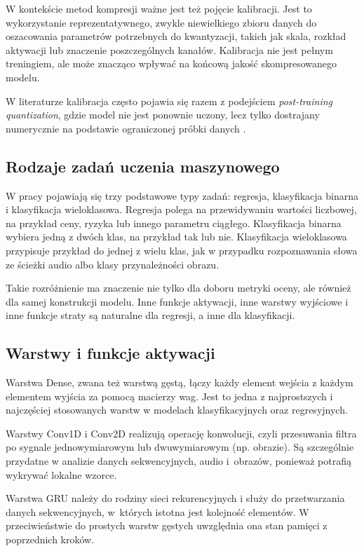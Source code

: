 W kontekście metod kompresji ważne jest też pojęcie kalibracji. Jest to wykorzystanie reprezentatywnego, zwykle niewielkiego zbioru danych do oszacowania parametrów potrzebnych do kwantyzacji, takich jak skala, rozkład aktywacji lub znaczenie poszczególnych kanałów. Kalibracja nie jest pełnym treningiem, ale może znacząco wpływać na końcową jakość skompresowanego modelu.

W literaturze kalibracja często pojawia się razem z podejściem \textit{post-training quantization}, gdzie model nie jest ponownie uczony, lecz tylko dostrajany numerycznie na podstawie ograniczonej próbki danych \cite{frantar2023gptq,NIPS1989_6c9882bb}.

\subsection{Rodzaje zadań uczenia maszynowego}

W pracy pojawiają się trzy podstawowe typy zadań: regresja, klasyfikacja binarna i klasyfikacja wieloklasowa. Regresja polega na przewidywaniu wartości liczbowej, na przykład ceny, ryzyka lub innego parametru ciągłego. Klasyfikacja binarna wybiera jedną z dwóch klas, na przykład tak lub nie. Klasyfikacja wieloklasowa przypisuje przykład do jednej z wielu klas, jak w przypadku rozpoznawania słowa ze ścieżki audio albo klasy przynależności obrazu.

Takie rozróżnienie ma znaczenie nie tylko dla doboru metryki oceny, ale również dla samej konstrukcji modelu. Inne funkcje aktywacji, inne warstwy wyjściowe i inne funkcje straty są naturalne dla regresji, a inne dla klasyfikacji.

\subsection{Warstwy i funkcje aktywacji}

Warstwa Dense, zwana też warstwą gęstą, łączy każdy element wejścia z każdym elementem wyjścia za pomocą macierzy wag. Jest to jedna z najprostszych i najczęściej stosowanych warstw w modelach klasyfikacyjnych oraz regresyjnych.

Warstwy Conv1D i Conv2D realizują operację konwolucji, czyli przesuwania filtra po sygnale jednowymiarowym lub dwuwymiarowym (np. obrazie). Są szczególnie przydatne w analizie danych sekwencyjnych, audio i~obrazów, ponieważ potrafią wykrywać lokalne wzorce.

Warstwa GRU należy do rodziny sieci rekurencyjnych i służy do przetwarzania danych sekwencyjnych, w~których istotna jest kolejność elementów. W przeciwieństwie do prostych warstw gęstych uwzględnia ona stan pamięci z poprzednich kroków.


